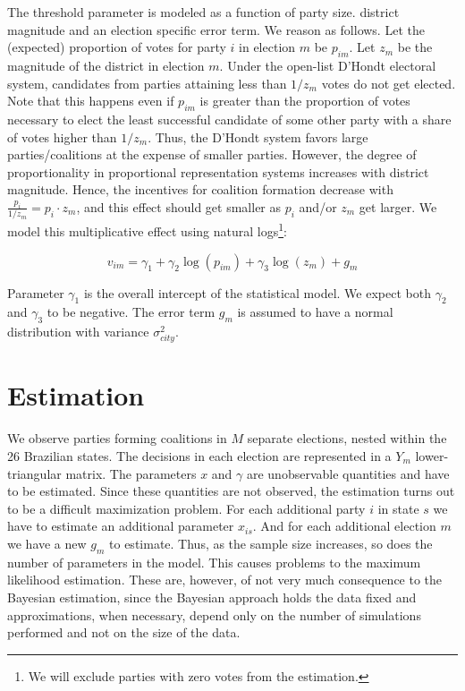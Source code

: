 The threshold parameter is modeled as a function of party size. district magnitude and an election specific error term. We reason as follows. Let the (expected) proportion of votes for party $i$ in election $m$ be $p_{im}$. Let $z_{m}$ be the magnitude of the district in election $m$. Under the open-list  D'Hondt electoral system, candidates  from parties attaining less than $1/z_{m}$ votes do not get elected. Note that this happens even if  $p_{im}$ is greater than the proportion of votes necessary to elect the least successful candidate of some other party with a share of votes higher  than $1/z_{m}$.  Thus, the  D'Hondt system favors large parties/coalitions at the expense of smaller parties. However, the degree of proportionality in proportional representation systems increases with district magnitude. Hence, the incentives for coalition formation decrease with $\frac{p_i}{1/z_{m}}=p_i\cdot z_{m}$, and this effect should get smaller as $p_i$ and/or $z_{m}$ get larger. We model this multiplicative effect using natural logs\footnote{We will exclude parties with zero votes from the estimation.}:

\begin{equation}
  \label{eq:1}
  v_{im}=\gamma_1 +\gamma_2\log(p_{im})+\gamma_3 \log(z_m)+g_m
\end{equation}

Parameter $\gamma_1$ is the overall intercept of the statistical model. We expect both $\gamma_2$ and $\gamma_3$ to be negative. The error term $g_m$ is assumed to have a normal distribution with variance $\sigma_{city}^2$. 

\section{Estimation}

We observe parties forming coalitions in  $M$ separate elections, nested within the 26 Brazilian states. The decisions in each election are represented in a  $Y_m$ lower-triangular matrix.  The parameters $x$ and $\gamma$ are unobservable quantities and have to be estimated.  Since these quantities are not observed,  the estimation turns out to be a difficult maximization problem.  For each additional party $i$ in state $s$ we have to estimate  an additional parameter  $x_{is}$. And for each additional election $m$ we have a new $g_m$ to estimate.  Thus, as the sample size increases, so does the number of parameters in the model. This causes problems to the maximum likelihood estimation.\citep[p.358]{clinton:2004} These are, however, of not very much consequence to the Bayesian estimation, since the Bayesian approach holds the data fixed and approximations, when necessary, depend only on the number of simulations performed and not on the size of the data.  

